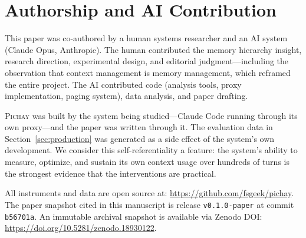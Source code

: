\section*{Authorship and AI Contribution}
\label{sec:authorship}

This paper was co-authored by a human systems researcher and an AI
system (Claude Opus, Anthropic). The human contributed the memory
hierarchy insight, research direction, experimental design, and
editorial judgment---including the observation that context
management is memory management, which reframed the entire project.
The AI contributed code (analysis tools, proxy implementation,
paging system), data analysis, and paper drafting.

\textsc{Pichay} was built by the system being studied---Claude Code
running through its own proxy---and the paper was written through it.
The evaluation data in Section~\ref{sec:production} was generated as
a side effect of the system's own development. We consider this
self-referentiality a feature: the system's ability to measure,
optimize, and sustain its own context usage over hundreds of turns is
the strongest evidence that the interventions are practical.

All instruments and data are open source at:
\url{https://github.com/fsgeek/pichay}.
The paper snapshot cited in this manuscript is release
\texttt{v0.1.0-paper} at commit \texttt{b56701a}.
An immutable archival snapshot is available via Zenodo DOI:
\url{https://doi.org/10.5281/zenodo.18930122}.

